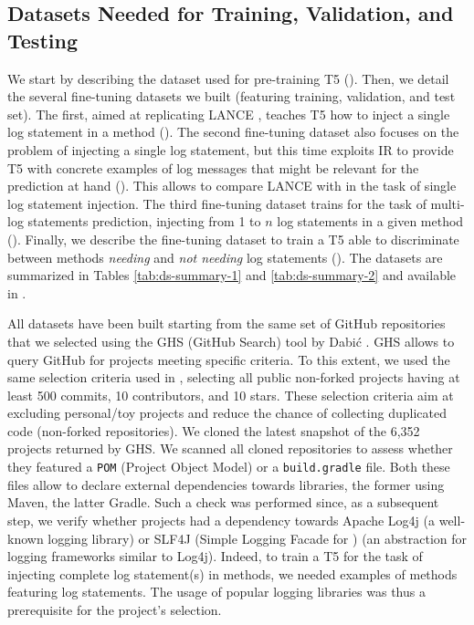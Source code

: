 \subsection{Datasets Needed for Training, Validation, and Testing}
\label{sub:datasets}

We start by describing the dataset used for pre-training T5 (). Then, we detail the several fine-tuning datasets we built (featuring training, validation, and test set). The first, aimed at replicating LANCE \cite{mastropaolo2022using}, teaches T5 how to inject a single log statement in a \java method  (). The second fine-tuning dataset also focuses on the problem of injecting a single log statement, but this time exploits IR to provide T5 with concrete examples of log messages that might be relevant for the prediction at hand (). This allows to compare LANCE with \approach in the task of single log statement injection. The third fine-tuning dataset trains \approach for the task of multi-log statements prediction, \ie injecting from 1 to $n$ log statements in a given method (). Finally, we describe the fine-tuning dataset to train a T5 able to discriminate between methods \emph{needing} and \emph{not needing} log statements (). The datasets are summarized in Tables \ref{tab:ds-summary-1} and \ref{tab:ds-summary-2} and available in \cite{replication}.


All datasets have been built starting from the same set of GitHub repositories that we selected using the GHS (GitHub Search) tool by Dabi\'c \etal \cite{dabic2021sampling}. GHS allows to query GitHub for projects meeting specific criteria. To this extent, we used the same selection criteria used in \cite{mastropaolo2022using}, selecting all public non-forked \java projects having at least 500 commits, 10 contributors, and 10 stars. These selection criteria aim at excluding personal/toy projects and reduce the chance of collecting duplicated code (non-forked repositories). We cloned the latest snapshot of the 6,352 projects returned by GHS. We scanned all cloned repositories to assess whether they featured a \texttt{POM} (Project Object Model) or a \texttt{build.gradle} file. Both these files allow to declare external dependencies towards libraries, the former using Maven, the latter Gradle. Such a check was performed since, as a subsequent step, we verify whether projects had a dependency towards Apache Log4j \cite{log4j} (\ie a well-known \java logging library) or SLF4J (Simple Logging Facade for \java) \cite{slf4j} (\ie an abstraction for \java logging frameworks similar to Log4j). Indeed, to train a T5 for the task of injecting complete log statement(s) in \java methods, we needed examples of methods featuring log statements. The usage of popular logging \java libraries was thus a prerequisite for the project's selection.

